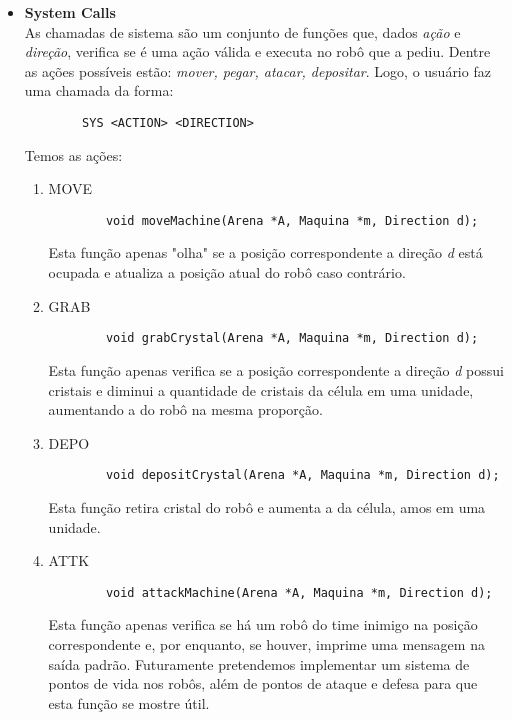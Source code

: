 \documentclass{article}
\begin{document}
\begin{itemize}
\begin{lstlisting}
    \end{lstlisting}
    Nada mais que um \textit{loop} que percorre o vetor de rob\^os da Arena e executa as instru\c c\~oes fornecidas ao rob\^o um n\'umero \textit{ciclos} de vezes.\\
    Dessa forma, o \textit{game loop} \'e formado por uma s\'erie de chamadas desta fun\c c\~ao, utilizadas at\'e que um dos times saia vencedor.
    
    \item \textbf{System Calls} \\
    As chamadas de sistema s\~ao um conjunto de fun\c c\~oes que, dados \textit{a\c c\~ao} e \textit{dire\c c\~ao}, verifica se \'e uma a\c c\~ao v\'alida e executa no rob\^o que a pediu. Dentre as a\c c\~oes poss\'iveis est\~ao: \textit{mover, pegar, atacar, depositar}. Logo, o usu\'ario faz uma chamada da forma:
    \begin{lstlisting}
        SYS <ACTION> <DIRECTION>
    \end{lstlisting}
    Temos as a\c c\~oes:
    \begin{enumerate}
        \item MOVE
        \begin{lstlisting}
        void moveMachine(Arena *A, Maquina *m, Direction d);
        \end{lstlisting}
        Esta fun\c c\~ao apenas "olha" se a posi\c c\~ao correspondente a dire\c c\~ao \textit{d} est\'a ocupada e atualiza a posi\c c\~ao atual do rob\^o caso contr\'ario.
        
        \item GRAB
        \begin{lstlisting}
        void grabCrystal(Arena *A, Maquina *m, Direction d);
        \end{lstlisting}
        Esta fun\c c\~ao apenas verifica se a posi\c c\~ao correspondente a dire\c c\~ao \textit{d} possui cristais e diminui a quantidade de cristais da c\'elula em uma unidade, aumentando a do rob\^o na mesma propor\c c\~ao.
        
        \item DEPO
        \begin{lstlisting}
        void depositCrystal(Arena *A, Maquina *m, Direction d);
        \end{lstlisting}
        Esta fun\c c\~ao retira cristal do rob\^o e aumenta a da c\'elula, amos em uma unidade.
        \item ATTK
        \begin{lstlisting}
        void attackMachine(Arena *A, Maquina *m, Direction d);
        \end{lstlisting}
        Esta fun\c c\~ao apenas verifica se h\'a um rob\^o do time inimigo na posi\c c\~ao correspondente e, por enquanto, se houver, imprime uma mensagem na sa\'ida padr\~ao. Futuramente pretendemos implementar um sistema de pontos de vida nos rob\^os, al\'em de pontos de ataque e defesa para que esta fun\c c\~ao se mostre \'util.
    \end{enumerate}
    

\end{itemize}
\end{document}

